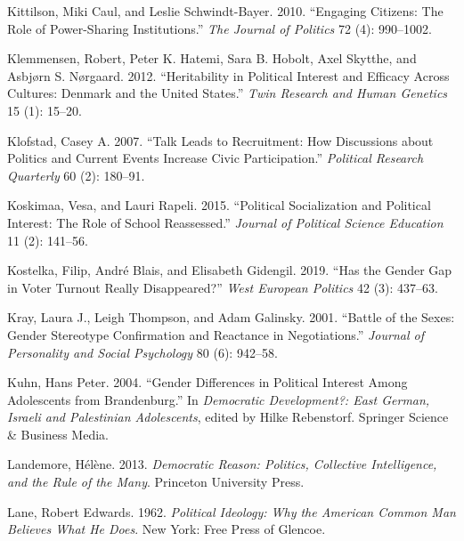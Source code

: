 \documentclass[
  letterpaper,
  DIV=11,
  numbers=noendperiod]{scrreprt}
\newlength{\cslhangindent}
\newlength{\cslentryspacingunit} %
\newenvironment{CSLReferences}[2] %
 {%
  \setlength{\parindent}{0pt}
  \ifodd #1
  \let\oldpar\par
  \def\par{\hangindent=\cslhangindent\oldpar}
  \fi
  \setlength{\parskip}{#2\cslentryspacingunit}
 }%
 {}
\begin{document}
\begin{CSLReferences}{1}{0}
\leavevmode{}%
Kittilson, Miki Caul, and Leslie Schwindt-Bayer. 2010. {``Engaging
Citizens: The Role of Power-Sharing Institutions.''} \emph{The Journal
of Politics} 72 (4): 990--1002.

\leavevmode{}%
Klemmensen, Robert, Peter K. Hatemi, Sara B. Hobolt, Axel Skytthe, and
Asbjørn S. Nørgaard. 2012. {``{Heritability in Political Interest and
Efficacy Across Cultures: Denmark and the United States}.''} \emph{Twin
Research and Human Genetics} 15 (1): 15--20.

\leavevmode{}%
Klofstad, Casey A. 2007. {``{Talk Leads to Recruitment: How Discussions
about Politics and Current Events Increase Civic Participation}.''}
\emph{Political Research Quarterly} 60 (2): 180--91.

\leavevmode{}%
Koskimaa, Vesa, and Lauri Rapeli. 2015. {``{Political Socialization and
Political Interest: The Role of School Reassessed}.''} \emph{Journal of
Political Science Education} 11 (2): 141--56.

\leavevmode{}%
Kostelka, Filip, André Blais, and Elisabeth Gidengil. 2019. {``{Has the
Gender Gap in Voter Turnout Really Disappeared?}''} \emph{West European
Politics} 42 (3): 437--63.

\leavevmode{}%
Kray, Laura J., Leigh Thompson, and Adam Galinsky. 2001. {``{Battle of
the Sexes: Gender Stereotype Confirmation and Reactance in
Negotiations}.''} \emph{Journal of Personality and Social Psychology} 80
(6): 942--58.

\leavevmode{}%
Kuhn, Hans Peter. 2004. {``{Gender Differences in Political Interest
Among Adolescents from Brandenburg}.''} In \emph{{Democratic
Development?: East German, Israeli and Palestinian Adolescents}}, edited
by Hilke Rebenstorf. Springer Science \& Business Media.

\leavevmode{}%
Landemore, Hélène. 2013. \emph{{Democratic Reason: Politics, Collective
Intelligence, and the Rule of the Many}}. Princeton University Press.

\leavevmode{}%
Lane, Robert Edwards. 1962. \emph{{Political Ideology: Why the American
Common Man Believes What He Does}}. New York: Free Press of Glencoe.


\end{CSLReferences}
\end{document}
